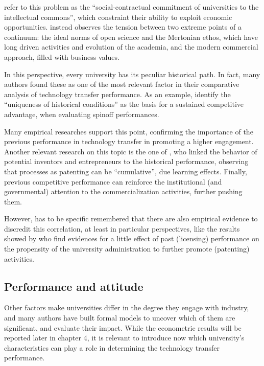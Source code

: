 \citet{Argyres1998} refer to this problem as the \enquote{social-contractual commitment of universities to the intellectual commons}, which constraint their ability to exploit economic opportunities. \citet{Muscio2013} instead observes the tension between two extreme points of a continuum: the ideal norms of open science and the Mertonian ethos, which have long driven activities and evolution of the academia, and the modern commercial approach, filled with business values.

In this perspective, every university has its peculiar historical path. In fact, many authors found these as one of the most relevant factor in their comparative analysis of technology transfer performance. As an example, \citet{OShea2005} identify the \enquote{uniqueness of historical conditions} as the basis for a sustained competitive advantage, when evaluating spinoff performances. 

Many empirical researches support this point, confirming the importance of the previous performance in technology transfer in promoting a higher engagement. Another relevant research on this topic is the one of \citet{Baldini2006}, who linked the behavior of potential inventors and entrepreneurs to the historical performance, observing that processes as patenting can be \enquote{cumulative}, due learning effects. Finally, previous competitive performance can reinforce the institutional (and governmental) attention to the commercialization activities, further pushing them.

However, has to be specific remembered that there are also empirical evidence to discredit this correlation, at least in particular perspectives, like the results showed by \citet{Thursby2002} who find evidences for a little effect of past (licensing) performance on the propensity of the university administration to further promote (patenting) activities.


\subsection{Performance and attitude}

Other factors make universities differ in the degree they engage with industry, and many authors have built formal models to uncover which of them are significant, and evaluate their impact. While the econometric results will be reported later in chapter 4, it is relevant to introduce now which university's characteristics can play a role in determining the technology transfer performance.

